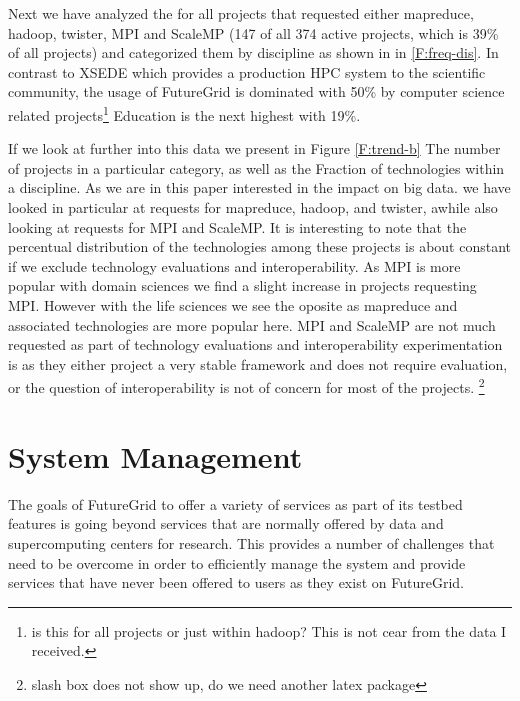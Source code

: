 \documentclass{article}
\newcommand{\FILE}[1]{\todo[color=green!40]{#1}}
\begin{document}
Next we have analyzed the for all projects that requested either mapreduce,
hadoop, twister, MPI and ScaleMP (147 of all 374 active projects,
which is 39\% of all projects) and categorized them by discipline as
shown in in \ref{F:freq-dis}. In contrast to XSEDE which provides a production HPC
system to the scientific community, the usage of FutureGrid is
dominated with 50\% by computer science related projects\footnote{is
  this for all projects or just within hadoop? This is not cear from
  the data I received.} Education is the next highest with 19\%.


If we look at further into this data we present in Figure
\ref{F:trend-b} The number of projects in a particular category, as
well as the Fraction of technologies within a discipline. As we are in
this paper interested in the impact on big data. we have looked in
particular at requests for mapreduce, hadoop, and twister, awhile also looking at
requests for MPI and ScaleMP. It is interesting to note that the
percentual distribution of the technologies among these projects is
about constant if we exclude technology evaluations and interoperability. As
MPI is more popular with domain sciences we find a slight increase in
projects requesting MPI. However with the life sciences we see the
oposite as mapreduce and associated technologies are more popular
here. MPI and ScaleMP are not much requested as part of technology
evaluations and interoperability experimentation is as they either
project a very stable framework and does not require evaluation, or
the question of interoperability is not of concern for most of the projects.
\footnote{slash box does not show up, do we need another latex package}






\FILE{devops.tex}

\section{System Management}

The goals of FutureGrid to offer a variety of services as part of its
testbed features is going beyond services that are normally offered by
data and supercomputing centers for research. This provides a number
of challenges that need to be overcome in order to efficiently manage
the system and provide services that have never been offered to users
as they exist on FutureGrid.
\end{document}
